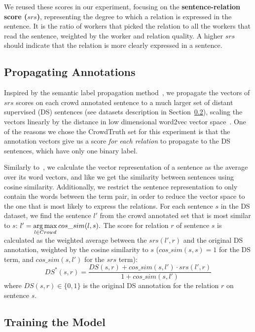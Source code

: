 We reused these scores in our experiment, focusing on the \textbf{sentence-relation score ($srs$)}, representing the degree to which a relation is expressed in the sentence. It is the ratio of workers that picked the relation to all the workers that read the sentence, weighted by the worker and relation quality.  A higher $srs$ should indicate that the relation is more clearly expressed in a sentence.

\subsection{Propagating Annotations}

Inspired by the semantic label propagation method~\cite{sterckx2016knowledge}, we propagate the vectors of $srs$ scores on each crowd annotated sentence to a much larger set of distant supervised (DS) sentences (see datasets description in Section~\ref{sec:train}), scaling the vectors linearly by the distance in low dimensional word2vec vector space~\cite{mikolov2013distributed}.  One of the reasons we chose the CrowdTruth set for this experiment is that the annotation vectors give us a score \emph{for each relation} to propagate to the DS sentences, which have only one binary label.

 Similarly to~\citet{sultan2015dls}, we calculate the vector representation of a sentence as the average over its word vectors, and like \citet{sterckx2016knowledge} we get the similarity between sentences using cosine similarity. Additionally, we restrict the sentence representation to only contain the words between the term pair, in order to reduce the vector space to the one that is most likely to express the relations. For each sentence $s$ in the DS dataset, we find the sentence $l'$ from the crowd annotated set that is most similar to $s$: $ l' = \operatorname*{arg\,max}\limits_{l \in Crowd} cos\_sim(l, s). $ The score for relation $r$ of sentence $s$ is calculated as the weighted average between the $srs(l', r)$ and the original DS annotation, weighted by the cosine similarity to $s$ ($ cos\_sim(s,s) = 1$ for the DS term, and $ cos\_sim(s, l')$ for the $srs$ term):
\begin{equation} \label{eq:ds_w2v}
DS^{*}(s, r) =  \dfrac{DS(s, r) +  cos\_sim(s, l') \cdot srs(l', r)}{1 +  cos\_sim(s, l')}
\end{equation}
\noindent where $DS(s, r) \in \{0,1\}$ is the original DS annotation for the relation $r$ on sentence $s$.


\subsection{Training the Model}
\label{sec:train}

